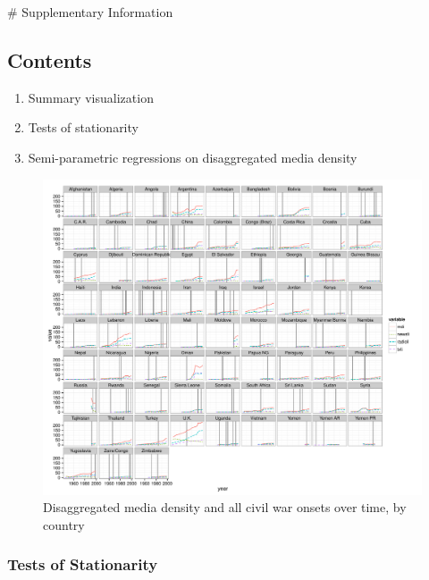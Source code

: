 \documentclass[11pt,article,oneside]{memoir}
\makeatletter
\def\maxwidth{\ifdim\Gin@nat@width>\linewidth\linewidth
\else\Gin@nat@width\fi}
\let\Oldincludegraphics\includegraphics
\renewcommand{\includegraphics}[1]{\Oldincludegraphics[width=\maxwidth]{#1}}
\makeatother
\begin{document}
\clearpage
\# Supplementary Information

\subsection{Contents}\label{contents}

\begin{enumerate}
\def\labelenumi{\arabic{enumi}.}
\itemsep1pt\parskip0pt
\item
  Summary visualization
\item
  Tests of stationarity
\item
  Semi-parametric regressions on disaggregated media density
\end{enumerate}

\begin{figure}[htbp]
\centering
\includegraphics{./media_civil_war_files/figure-markdown/full_panel_plot.pdf}
\caption{Disaggregated media density and all civil war onsets over time,
by country}
\end{figure}

\subsubsection{Tests of Stationarity}\label{tests-of-stationarity}
\end{document}
